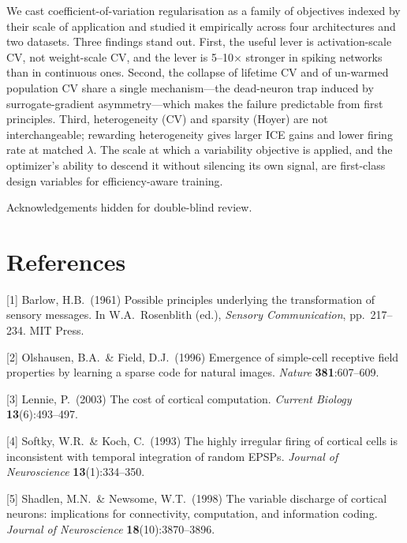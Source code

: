 \documentclass{article}
\begin{document}
We cast coefficient-of-variation regularisation as a family of objectives indexed by their scale of application and studied it empirically across four architectures and two datasets. Three findings stand out. First, the useful lever is activation-scale CV, not weight-scale CV, and the lever is 5--10$\times$ stronger in spiking networks than in continuous ones. Second, the collapse of lifetime CV and of un-warmed population CV share a single mechanism---the dead-neuron trap induced by surrogate-gradient asymmetry---which makes the failure predictable from first principles. Third, heterogeneity (CV) and sparsity (Hoyer) are not interchangeable; rewarding heterogeneity gives larger ICE gains and lower firing rate at matched $\lambda$. The scale at which a variability objective is applied, and the optimizer's ability to descend it without silencing its own signal, are first-class design variables for efficiency-aware training.

\begin{ack}
Acknowledgements hidden for double-blind review.
\end{ack}


\section*{References}

{
\small


}

\iffalse

[1] Barlow, H.B.\ (1961) Possible principles underlying the transformation of sensory messages. In W.A.\ Rosenblith (ed.), {\it Sensory Communication}, pp.\ 217--234. MIT Press.

[2] Olshausen, B.A.\ \& Field, D.J.\ (1996) Emergence of simple-cell receptive field properties by learning a sparse code for natural images. {\it Nature} {\bf 381}:607--609.

[3] Lennie, P.\ (2003) The cost of cortical computation. {\it Current Biology} {\bf 13}(6):493--497.

[4] Softky, W.R.\ \& Koch, C.\ (1993) The highly irregular firing of cortical cells is inconsistent with temporal integration of random EPSPs. {\it Journal of Neuroscience} {\bf 13}(1):334--350.

[5] Shadlen, M.N.\ \& Newsome, W.T.\ (1998) The variable discharge of cortical neurons: implications for connectivity, computation, and information coding. {\it Journal of Neuroscience} {\bf 18}(10):3870--3896.
\end{document}
